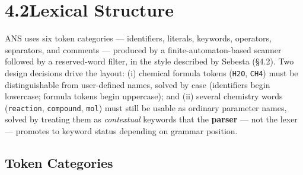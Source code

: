 \documentclass[11pt,a4paper]{article}
\newcommand{\code}[1]{\texttt{#1}}
\begin{document}
\section{4.2\quad Lexical Structure}

ANS uses six token categories --- identifiers, literals, keywords, operators, separators, and comments --- produced by a finite-automaton-based scanner followed by a reserved-word filter, in the style described by Sebesta (\S4.2). Two design decisions drive the layout: (i) chemical formula tokens (\code{H2O}, \code{CH4}) must be distinguishable from user-defined names, solved by case (identifiers begin lowercase; formula tokens begin uppercase); and (ii) several chemistry words (\code{reaction}, \code{compound}, \code{mol}) must still be usable as ordinary parameter names, solved by treating them as \textit{contextual} keywords that the \textbf{parser} --- not the lexer --- promotes to keyword status depending on grammar position.

\subsection{Token Categories}
\end{document}
